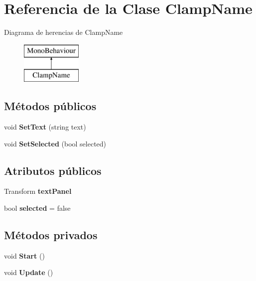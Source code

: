 \hypertarget{class_clamp_name}{}\section{Referencia de la Clase Clamp\+Name}
\label{class_clamp_name}
Diagrama de herencias de Clamp\+Name\begin{figure}[H]
\begin{center}
\leavevmode
\includegraphics[height=2.000000cm]{class_clamp_name}
\end{center}
\end{figure}
\subsection*{Métodos públicos}
\begin{DoxyCompactItemize}
\item 
\mbox{\label{class_clamp_name_a8845016c54fa64235db1c72716098f96}} 
void {\bfseries Set\+Text} (string text)
\item 
\mbox{\label{class_clamp_name_ae3850d4ccc21188089e261ab805c036b}} 
void {\bfseries Set\+Selected} (bool selected)
\end{DoxyCompactItemize}
\subsection*{Atributos públicos}
\begin{DoxyCompactItemize}
\item 
\mbox{\label{class_clamp_name_ad49af9dcd383039bcc2759c1c36e98a5}} 
Transform {\bfseries text\+Panel}
\item 
\mbox{\label{class_clamp_name_a2d7befc258d1492eec30282262971192}} 
bool {\bfseries selected} = false
\end{DoxyCompactItemize}
\subsection*{Métodos privados}
\begin{DoxyCompactItemize}
\item 
\mbox{\label{class_clamp_name_a3ad778915f5ec92531c5bf98b23792af}} 
void {\bfseries Start} ()
\item 
\mbox{\label{class_clamp_name_aaebb9af2778306a7994838a028dc3cc0}} 
void {\bfseries Update} ()
\end{DoxyCompactItemize}
